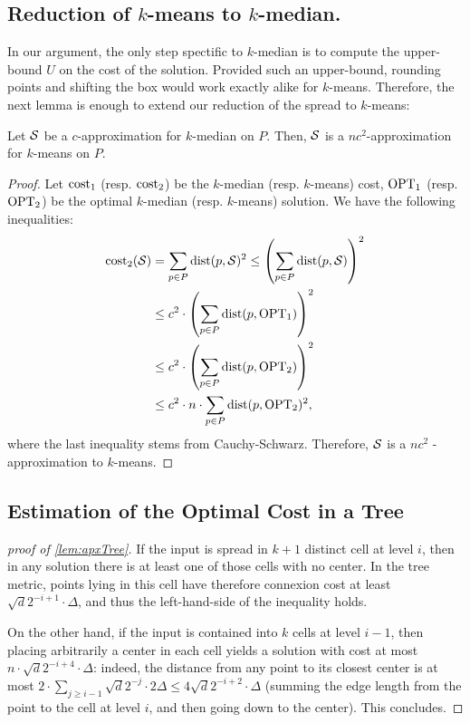 \subsection{Reduction of $k$-means to $k$-median.}
\label{app:redKM}
In our argument, the only step spectific to $k$-median is to compute the upper-bound $U$ on the cost of the solution. Provided such an upper-bound, rounding points and shifting the box would work exactly alike for $k$-means. Therefore, the next lemma is enough to extend our reduction of the spread to $k$-means:
\begin{lemma}\label{lem:kmedTokmeans}
Let $\mathcal S$ be a $c$-approximation for $k$-median on $P$. Then, $\mathcal S$ is a $nc^2$-approximation for $k$-means on $P$.
\end{lemma}
\begin{proof}
Let $\operatorname{cost}_1$ (resp. $\operatorname{cost}_2$) be the $k$-median (resp. $k$-means) cost, $\text{OPT}_1$ (resp. $\text{OPT}_2$) be the optimal $k$-median (resp. $k$-means) solution. We have the following inequalities:
\begin{align*}
\operatorname{cost}_2(\mathcal S) &= \sum_{p\in P} \operatorname{dist}(p, \mathcal S)^2 \leq \left( \sum_{p\in P} \operatorname{dist}(p, \mathcal S)\right)^2\\
&\leq c^2 \cdot \left(  \sum_{p\in P} \operatorname{dist}(p, \text{OPT}_1)\right)^2\\
&\leq c^2 \cdot \left(  \sum_{p\in P} \operatorname{dist}(p, \text{OPT}_2)\right)^2\\
&\leq c^2 \cdot n \cdot  \sum_{p\in P} \operatorname{dist}(p, \text{OPT}_2)^2,
\end{align*}
where the last inequality stems from Cauchy-Schwarz. Therefore, $\mathcal S$ is a $nc^2$ - approximation to $k$-means. 
\end{proof}

\subsection{Estimation of the Optimal Cost in a Tree}
\label{app:apx-tree-proof}

\begin{proof}[proof of \cref{lem:apxTree}]
If the input is spread in $k+1$ distinct cell at level $i$, then in any solution there is at least one of those cells with no center. In the tree metric, points
lying in this cell have therefore connexion cost at least $\sqrt{d}2^{-i+1} \cdot \Delta$, and thus the left-hand-side of the inequality holds.

On the other hand, if the input is contained into $k$ cells at level $i-1$, then placing arbitrarily a center in each cell yields a solution with cost at most
$n \cdot \sqrt{d}2^{-i+4} \cdot \Delta$: indeed, the distance from any point to its closest center is at most $2 \cdot \sum_{j \geq i-1} \sqrt{d}2^{-j} \cdot
2\Delta \leq 4 \sqrt{d}2^{-i+2} \cdot \Delta$ (summing the edge length from the point to the cell at level $i$, and then going down to the center). This
concludes.
\end{proof}


